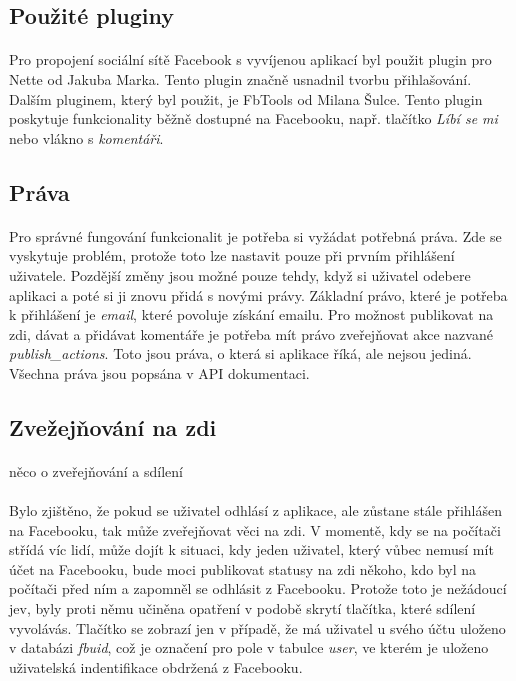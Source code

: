 \documentclass[11pt,a4paper,titlepage,oneside]{book}
\begin{document}
			\subsection{Použité pluginy}
				\paragraph{} Pro propojení sociální sítě Facebook s vyvíjenou aplikací byl použit plugin pro Nette\cite{nette20login} od Jakuba Marka. Tento plugin značně usnadnil tvorbu přihlašování. Dalším pluginem, který byl použit, je FbTools\cite{FbTools} od Milana Šulce. Tento plugin poskytuje funkcionality běžně dostupné na Facebooku, např. tlačítko \textit{Líbí se mi} nebo vlákno s \textit{komentáři}.
			\subsection{Práva}
				\paragraph{} Pro správné fungování funkcionalit je potřeba si vyžádat potřebná  práva. Zde se vyskytuje problém, protože toto lze nastavit pouze při prvním přihlášení uživatele. Pozdější změny jsou možné pouze tehdy, když si uživatel odebere aplikaci a poté si ji znovu přidá s novými právy. Základní právo, které je potřeba k přihlášení je \textit{email}, které povoluje získání emailu. Pro možnost publikovat na zdi, dávat  a přidávat komentáře je potřeba mít právo zveřejňovat akce nazvané \textit{publish\_actions}. Toto jsou práva, o která si aplikace říká, ale nejsou jediná. Všechna práva jsou popsána v API dokumentaci\cite{FbApiPrava}.
			\subsection{Zvežejňování na zdi}
				\paragraph{} {\Huge něco o zveřejňování a sdílení}
				\paragraph{} Bylo zjištěno, že pokud se uživatel odhlásí z aplikace, ale zůstane stále přihlášen na Facebooku, tak může zveřejňovat věci na zdi. V momentě, kdy se na počítači střídá víc lidí, může dojít k situaci, kdy jeden uživatel, který vůbec nemusí mít účet na Facebooku, bude moci publikovat statusy na zdi někoho, kdo byl na počítači před ním a zapomněl se odhlásit z Facebooku. Protože toto je nežádoucí jev, byly proti němu učiněna opatření v podobě skrytí tlačítka, které sdílení vyvolávás. Tlačítko se zobrazí jen v případě, že má uživatel u svého účtu uloženo v databázi \textit{fbuid}, což je označení pro pole v tabulce \textit{user}, ve kterém je uloženo uživatelská indentifikace obdržená z Facebooku.
\end{document}
